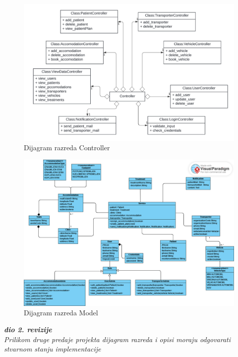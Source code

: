 			\begin{figure}[H]
				\includegraphics[width=\textwidth]{slike/UML_controller.PNG} %
				\caption{Dijagram razreda Controller}
				\label{fig:uml_controller} %
			\end{figure}
			
			\begin{figure}[H]
				\includegraphics[width=\textwidth]{slike/UML_new_model.PNG} %
				\caption{Dijagram razreda Model}
				\label{fig:uml_model} %
			\end{figure}
			
			\textbf{\textit{dio 2. revizije}}\\			
			
			\textit{Prilikom druge predaje projekta dijagram razreda i opisi moraju odgovarati stvarnom stanju implementacije}
			
